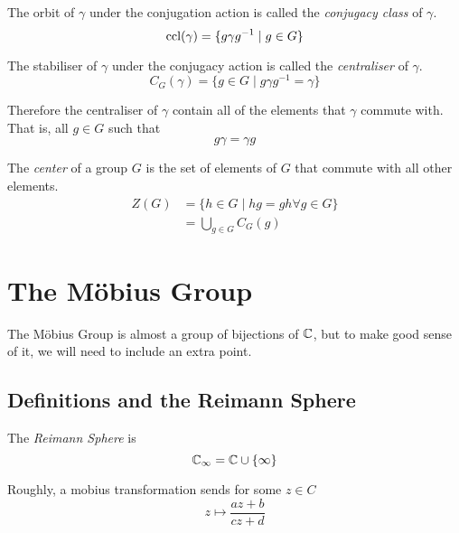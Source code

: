 \documentclass{article}
\begin{document}
\begin{defi}
    The orbit of $\gamma$ under the conjugation action is called the \emph{conjugacy class} of $\gamma$.
    \[
        \operatorname{ccl}(\gamma) = \{g \gamma g^{-1} \mid g \in G\}  
    \]
\end{defi}

\begin{defi}[Centraliser]
    The stabiliser of $\gamma$ under the conjugacy action is called the \emph{centraliser} of $\gamma$.
    \[
        C_G(\gamma) = \{g \in G \mid g \gamma g^{-1} = \gamma\}  
    \]

    Therefore the centraliser of $\gamma$ contain all of the elements that $\gamma$ commute with. That is, all $g \in G$ such that
    \[
        g \gamma = \gamma g  
    \]
\end{defi}

\begin{defi}[Center]
    The \emph{center} of a group $G$ is the set of elements of $G$ that commute with all other elements. 
    \begin{align*}
        Z(G) &= \{h \in G \mid hg = gh \forall g \in G\} \\
        &= \bigcup_{g \in G} C_G(g)
    \end{align*}
\end{defi}

\section{The M\"obius Group}

The M\"obius Group is almost a group of bijections of $\mathbb{C}$, but to make good sense of it, we will need to include an extra point.

\subsection{Definitions and the Reimann Sphere}
\begin{defi}
    The \emph{Reimann Sphere} is
    \[
        \mathbb{C}_\infty = \mathbb{C} \cup \{\infty\}    
    \]
\end{defi}

Roughly, a mobius transformation sends for some $z \in C$
\[
    z \mapsto \frac{az + b}{cz + d}
\]
\end{document}
